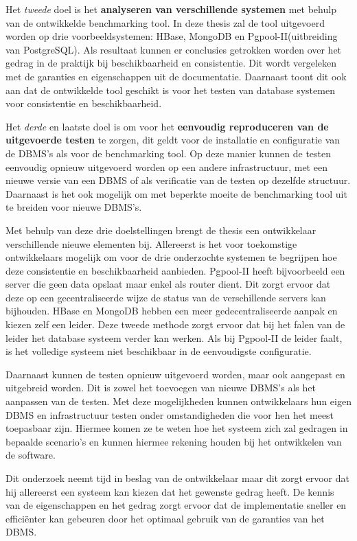 Het \textit{tweede} doel is het \textbf{analyseren van verschillende systemen} met behulp van de ontwikkelde benchmarking tool. In deze thesis zal de tool uitgevoerd worden op drie voorbeeldsystemen: HBase, MongoDB en Pgpool-II(uitbreiding van PostgreSQL). Als resultaat kunnen er conclusies getrokken worden over het gedrag in de praktijk bij beschikbaarheid en consistentie. Dit wordt vergeleken met de garanties en eigenschappen uit de documentatie. Daarnaast toont dit ook aan dat de ontwikkelde tool geschikt is voor het testen van database systemen voor consistentie en beschikbaarheid. 

Het \textit{derde} en laatste doel is om voor het \textbf{eenvoudig reproduceren van de uitgevoerde testen} te zorgen, dit geldt voor de installatie en configuratie van de DBMS's als voor de benchmarking tool. Op deze manier kunnen de testen eenvoudig opnieuw uitgevoerd worden op een andere infrastructuur, met een nieuwe versie van een DBMS of als verificatie van de testen op dezelfde structuur. Daarnaast is het ook mogelijk om met beperkte moeite de benchmarking tool uit te breiden voor nieuwe DBMS's.  

Met behulp van deze drie doelstellingen brengt de thesis een ontwikkelaar verschillende nieuwe elementen bij. Allereerst is het voor toekomstige ontwikkelaars mogelijk om voor de drie onderzochte systemen te begrijpen hoe deze consistentie en beschikbaarheid aanbieden. Pgpool-II heeft bijvoorbeeld een server die geen data opslaat maar enkel als router dient. Dit zorgt ervoor dat deze op een gecentraliseerde wijze de status van de verschillende servers kan bijhouden. HBase en MongoDB hebben een meer gedecentraliseerde aanpak en kiezen zelf een leider. Deze tweede methode zorgt ervoor dat bij het falen van de leider het database systeem verder kan werken. Als bij Pgpool-II de leider faalt, is het volledige systeem niet beschikbaar in de eenvoudigste configuratie. 

Daarnaast kunnen de testen opnieuw uitgevoerd worden, maar ook aangepast en uitgebreid worden. Dit is zowel het toevoegen van nieuwe DBMS's als het aanpassen van de testen. Met deze mogelijkheden kunnen ontwikkelaars hun eigen DBMS en infrastructuur testen onder omstandigheden die voor hen het meest toepasbaar zijn. Hiermee komen ze te weten hoe het systeem zich zal gedragen in bepaalde scenario's en kunnen hiermee rekening houden bij het ontwikkelen van de software. 

Dit onderzoek neemt tijd in beslag van de ontwikkelaar maar dit zorgt ervoor dat hij allereerst een systeem kan kiezen dat het gewenste gedrag heeft. De kennis van de eigenschappen en het gedrag zorgt ervoor dat de implementatie sneller en efficiënter kan gebeuren door het optimaal gebruik van de garanties van het DBMS. 


